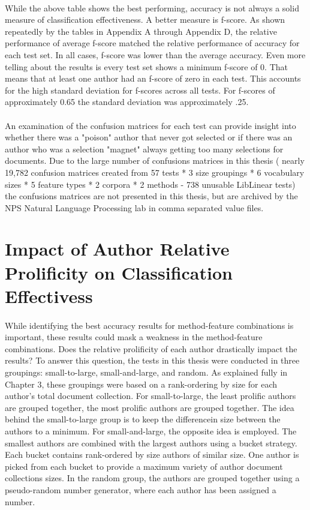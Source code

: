 	\paragraph*{} While the above table shows the best performing, accuracy is not always a solid measure of classification effectiveness.  A better measure is f-score.  As shown repeatedly by the tables in Appendix A through Appendix D, the relative performance of average f-score matched the relative performance of accuracy for each test set.  In all cases, f-score was lower than the average accuracy.  Even more telling about the results is every test set shows a minimum f-score of 0.  That means that at least one author had an f-score of zero in each test.  This accounts for the high standard deviation for f-scores across all tests.  For f-scores of approximately 0.65 the standard deviation was approximately .25.
	
	\paragraph*{} An examination of the confusion matrices for each test can provide insight into whether there was a "poison" author that never got selected or if there was an author who was a selection "magnet" always getting too many selections for documents.  Due to the large number of confusions matrices in this thesis ( nearly 19,782 confusion matrices created from 57 tests * 3 size groupings * 6 vocabulary sizes * 5 feature types * 2 corpora * 2 methods -  738 unusable LibLinear tests) the confusions matrices are not presented in this thesis, but are archived by the NPS Natural Language Processing lab in comma separated value files.

\section{Impact of Author Relative Prolificity on Classification Effectivess}
	\paragraph*{} While identifying the best accuracy results for method-feature combinations is important, these results could mask a weakness in the method-feature combinations.  Does the relative prolificity of each author drastically impact the results?  To answer this question, the tests in this thesis were conducted in three groupings: small-to-large, small-and-large, and random.  As explained fully in Chapter 3, these groupings were based on a rank-ordering by size for each author's total document collection.  For small-to-large, the least prolific authors are grouped together, the most prolific authors are grouped together. The idea behind the small-to-large group is to keep the differencein size between the authors to a minimum. For small-and-large, the opposite idea is employed.  The smallest authors are combined with the largest authors using a bucket strategy.  Each bucket contains rank-ordered by size authors of similar size.  One author is picked from each bucket to provide a maximum variety of author document collections sizes.  In the random group, the authors are grouped together using a pseudo-random number generator, where each author has been assigned a number.
